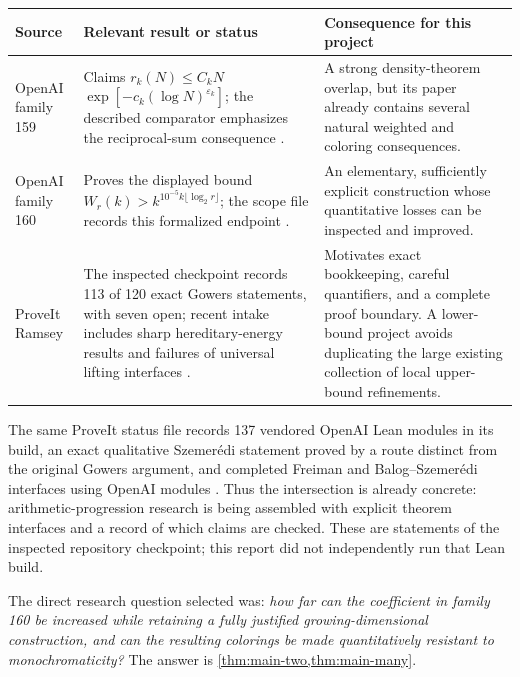 \begin{center}
\small
\begin{tabular}{@{}>{\raggedright\arraybackslash}p{}>{\raggedright\arraybackslash}p{}>{\raggedright\arraybackslash}p{}@{}}
\toprule
Source&Relevant result or status&Consequence for this project\\
\midrule
OpenAI family 159&
Claims \(r_k(N)\le C_kN\) \(\exp[-c_k(\log N)^{\varepsilon_k}]\);
the described comparator emphasizes the reciprocal-sum consequence
\cite{openai159,openai159Scope}.&
A strong density-theorem overlap, but its paper already contains
several natural weighted and coloring consequences.\\
\addlinespace
OpenAI family 160&
Proves the displayed bound
\(W_r(k)>k^{10^{-5}k\lfloor\log_2r\rfloor}\);
the scope file records this formalized endpoint
\cite{openai160,openai160Scope}.&
An elementary, sufficiently explicit construction whose quantitative
losses can be inspected and improved.\\
\addlinespace
ProveIt Ramsey&
The inspected checkpoint records 113 of 120 exact Gowers statements,
with seven open; recent intake includes sharp hereditary-energy
results and failures of universal lifting interfaces
\cite{proveitStatus,proveitIntake}.&
Motivates exact bookkeeping, careful quantifiers, and a complete
proof boundary. A lower-bound project avoids duplicating the large
existing collection of local upper-bound refinements.\\
\bottomrule
\end{tabular}
\end{center}

The same ProveIt status file records 137 vendored OpenAI Lean modules
in its build, an exact qualitative Szemer\'edi statement proved by a
route distinct from the original Gowers argument, and completed
Freiman and Balog--Szemer\'edi interfaces using OpenAI modules
\cite{proveitStatus}. Thus the intersection is already concrete:
arithmetic-progression research is being assembled with explicit
theorem interfaces and a record of which claims are checked.
These are statements of the inspected repository checkpoint; this
report did not independently run that Lean build.

The direct research question selected was:
\emph{how far can the coefficient in family 160 be increased while
retaining a fully justified growing-dimensional construction, and can
the resulting colorings be made quantitatively resistant to
monochromaticity?}
The answer is \cref{thm:main-two,thm:main-many}.

